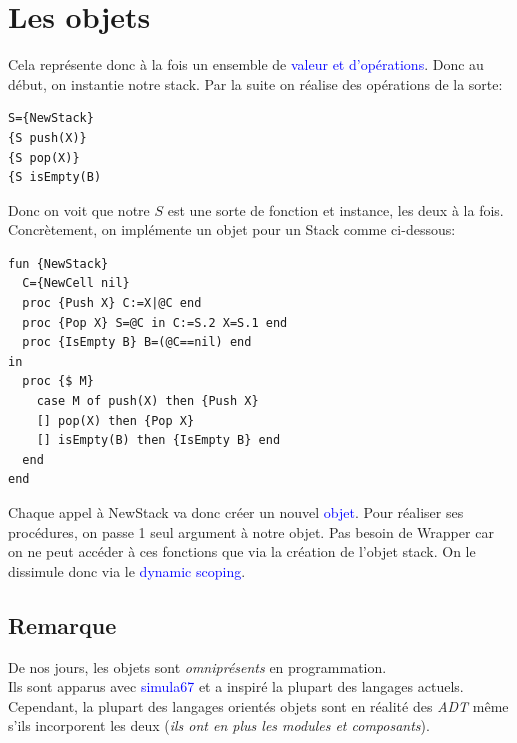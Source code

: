 \documentclass{report}
\begin{document}
\section{Les objets}
Cela représente donc à la fois un ensemble de \textcolor{blue}{valeur et d'opérations}. Donc au début, on instantie notre stack. Par la suite on réalise des opérations de la sorte:
\begin{lstlisting}[escapechar=\%]
S={NewStack} 
{S push(X)} 
{S pop(X)}
{S isEmpty(B)
\end{lstlisting}
Donc on voit que notre $S$ est une sorte de fonction et instance, les deux à la fois. Concrètement, on implémente un objet pour un Stack comme ci-dessous:
\begin{lstlisting}[escapechar=\%]
fun {NewStack} 
  C={NewCell nil} 
  proc {Push X} C:=X|@C end 
  proc {Pop X} S=@C in C:=S.2 X=S.1 end 
  proc {IsEmpty B} B=(@C==nil) end
in
  proc {$ M}
    case M of push(X) then {Push X} 
    [] pop(X) then {Pop X} 
    [] isEmpty(B) then {IsEmpty B} end
  end
end
\end{lstlisting}
Chaque appel à NewStack va donc créer un nouvel \textcolor{blue}{objet}. Pour réaliser ses procédures, on passe 1 seul argument à notre objet. Pas besoin de Wrapper car on ne peut accéder à ces fonctions que via la création de l'objet stack. On le dissimule donc via le \textcolor{blue}{dynamic scoping}.

\subsection{Remarque}
De nos jours, les objets sont \textit{omniprésents} en programmation.\\
Ils sont apparus avec \textcolor{blue}{simula67} et a inspiré la plupart des langages actuels.\\
Cependant, la plupart des langages orientés objets sont en réalité des \textit{ADT} même s'ils incorporent les deux (\textit{ils ont en plus les modules et composants}).
\end{document}
